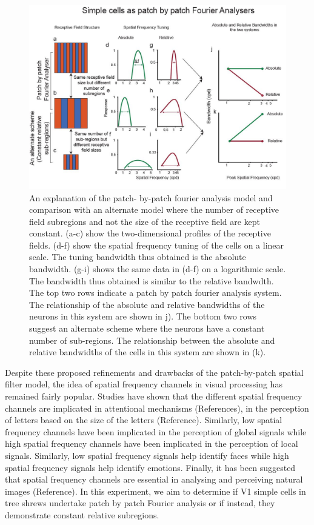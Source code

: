 	\begin{figure}[]
		
		\includegraphics[width=\linewidth]{LinearV1/scheme.jpg}
		\caption{An explanation of the patch- by-patch fourier analysis model and comparison with an alternate model where the number of receptive field subregions
			and not the size of the receptive field are kept constant. (a-c) show the two-dimensional profiles of the receptive fields. (d-f) show the spatial		frequency tuning of the cells on a linear scale. The tuning bandwidth thus obtained is the absolute bandwidth. (g-i) shows the same data in (d-f)
			on a logarithmic scale. The bandwidth thus obtained is similar to the relative bandwdth. The top two rows indicate a patch by patch fourier analysis
			system. The relationship of the absolute and relative bandwidths of the neurons in this system are shown in j). The bottom two rows suggest an alternate
			scheme where the neurons have a constant number of sub-regions. The relationship between the absolute and relative bandwidths of the cells in
			this system are shown in (k).}
		\label{fig:summary}
	\end{figure}

	Despite these proposed refinements and drawbacks of the patch-by-patch spatial filter model, the idea of spatial frequency channels in visual processing has remained fairly popular. Studies have shown that the different spatial frequency channels are implicated in attentional mechanisms (References), in the perception of letters based on the size of the letters (Reference). Similarly, low spatial frequency channels have been implicated in the perception of global signals while high spatial frequency channels have been implicated in the perception of local signals. Similarly, low spatial frequency signals help identify faces while high spatial frequency signals help identify emotions. Finally, it has been suggested that spatial frequency channels are essential in analysing and perceiving natural images (Reference). In this experiment, we aim to determine if V1 simple cells in tree shrews undertake patch by patch Fourier analysis or if instead, they demonstrate constant relative subregions.
	
